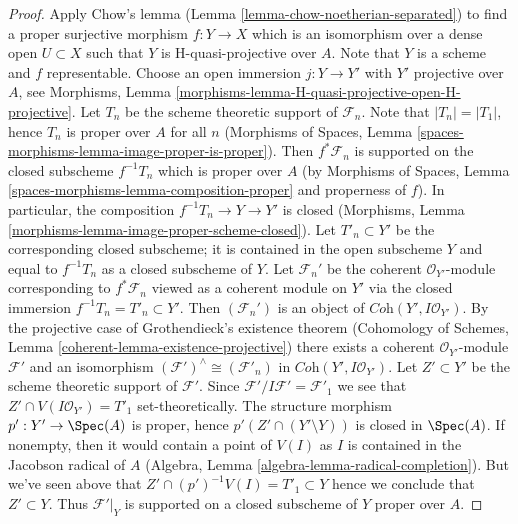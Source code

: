 \begin{proof}
\medskip\noindent
Apply Chow's lemma (Lemma \ref{lemma-chow-noetherian-separated})
to find a proper surjective morphism $f : Y \to X$ which is an isomorphism
over a dense open $U \subset X$ such that $Y$ is H-quasi-projective
over $A$. Note that $Y$ is a scheme and $f$ representable.
Choose an open immersion $j : Y \to Y'$ with $Y'$ projective over $A$, see
Morphisms, Lemma \ref{morphisms-lemma-H-quasi-projective-open-H-projective}.
Let $T_n$ be the scheme theoretic support of $\mathcal{F}_n$.
Note that $|T_n| = |T_1|$, hence $T_n$ is proper over $A$ for all $n$
(Morphisms of Spaces, Lemma
\ref{spaces-morphisms-lemma-image-proper-is-proper}).
Then $f^*\mathcal{F}_n$ is supported on the closed subscheme
$f^{-1}T_n$ which is proper over $A$ (by
Morphisms of Spaces, Lemma \ref{spaces-morphisms-lemma-composition-proper}
and properness of $f$).
In particular, the composition $f^{-1}T_n \to Y \to Y'$ is closed
(Morphisms, Lemma \ref{morphisms-lemma-image-proper-scheme-closed}).
Let $T'_n \subset Y'$ be the corresponding closed subscheme;
it is contained in the open subscheme $Y$ and equal to $f^{-1}T_n$
as a closed subscheme of $Y$. Let $\mathcal{F}_n'$
be the coherent $\mathcal{O}_{Y'}$-module corresponding to
$f^*\mathcal{F}_n$ viewed as a coherent module on $Y'$ via
the closed immersion $f^{-1}T_n = T'_n \subset Y'$.
Then $(\mathcal{F}_n')$
is an object of $\textit{Coh}(Y', I\mathcal{O}_{Y'})$.
By the projective case of Grothendieck's existence theorem
(Cohomology of Schemes, Lemma \ref{coherent-lemma-existence-projective})
there exists a coherent $\mathcal{O}_{Y'}$-module
$\mathcal{F}'$ and an isomorphism
$(\mathcal{F}')^\wedge \cong (\mathcal{F}'_n)$ in
$\textit{Coh}(Y', I\mathcal{O}_{Y'})$.
Let $Z' \subset Y'$ be the scheme theoretic support of $\mathcal{F}'$.
Since $\mathcal{F}'/I\mathcal{F}' = \mathcal{F}'_1$ we see
that $Z' \cap V(I\mathcal{O}_{Y'}) = T'_1$ set-theoretically.
The structure morphism $p' : Y' \to \Spec(A)$ is proper, hence
$p'(Z' \cap (Y' \setminus Y))$ is closed in $\Spec(A)$.
If nonempty, then it would contain a point of $V(I)$
as $I$ is contained in the Jacobson radical of $A$
(Algebra, Lemma \ref{algebra-lemma-radical-completion}).
But we've seen above that $Z' \cap (p')^{-1}V(I) = T'_1 \subset Y$
hence we conclude that $Z' \subset Y$. Thus $\mathcal{F}'|_Y$
is supported on a closed subscheme of $Y$ proper over $A$.


\end{proof}

